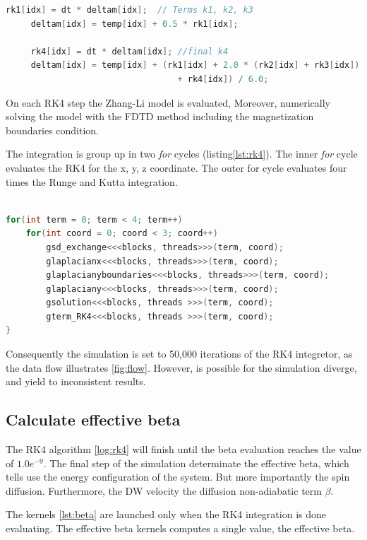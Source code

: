 \begin{lstlisting}[language=C++, label={lst:rkcuda}, caption={Runge and Kutta 4th Terms}]
     rk1[idx] = dt * deltam[idx];  // Terms k1, k2, k3
     deltam[idx] = temp[idx] + 0.5 * rk1[idx];
     
     rk4[idx] = dt * deltam[idx]; //final k4
     deltam[idx] = temp[idx] + (rk1[idx] + 2.0 * (rk2[idx] + rk3[idx])
                                  + rk4[idx]) / 6.0;
\end{lstlisting}

On each RK4 step the Zhang-Li model is evaluated, Moreover, numerically solving the model with the FDTD method including the magnetization boundaries condition.

The integration is group up in two \textit{for} cycles (listing\ref{lst:rk4}). The inner \textit{for} cycle evaluates the RK4 for the x, y, z coordinate. The outer for cycle evaluates four times the Runge and Kutta integration.

\begin{lstlisting}[language=C++, label={lst:rk4}, caption={Summarize of Runge and Kutta 4th Integration}]	

for(int term = 0; term < 4; term++)
	for(int coord = 0; coord < 3; coord++)
    	gsd_exchange<<<blocks, threads>>>(term, coord);
    	glaplacianx<<<blocks, threads>>>(term, coord);
    	glaplacianyboundaries<<<blocks, threads>>>(term, coord);
    	glaplaciany<<<blocks, threads>>>(term, coord);
    	gsolution<<<blocks, threads >>>(term, coord);
    	gterm_RK4<<<blocks, threads >>>(term, coord);
}
\end{lstlisting}

 Consequently the simulation is set to 50,000 iterations of the RK4 integretor, as the data flow illustrates  \ref{fig:flow}. However, is possible for the simulation diverge, and yield to inconsistent results.
 
\subsection{Calculate effective beta}

The RK4 algorithm \ref{log:rk4} will finish until the beta evaluation reaches the value of $1.0e^{-9}$. The final step of the simulation determinate the effective beta, which tells use the energy configuration of the system. But more importantly the spin diffusion. Furthermore, the DW velocity the diffusion non-adiabatic term $\beta$.

The kernels \ref{lst:beta} are launched only when the RK4 integration is done evaluating. The effective beta kernels computes a single value, the effective beta.

